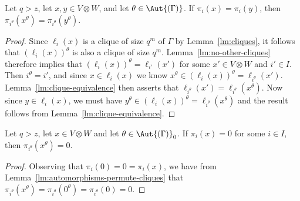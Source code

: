 \begin{lemma} \label{lm:automorphisms-permute-cliques}
Let $q > z$, let $x, y \in V \otimes W$, and let $\theta \in \Aut{\left(\Gamma \right)}$. If $\pi_i{\left(x \right)} = \pi_i{\left(y \right)}$, then $\pi_{i^\theta}{\left(x^\theta \right)} = \pi_{i^\theta}{\left(y^\theta \right)}$.
\end{lemma}
\begin{proof}
Since $\ell_i{\left(x \right)}$ is a clique of size $q^m$ of $\Gamma$ by Lemma~\ref{lm:cliques}, it follows that $\left(\ell_i{\left(x \right)}\right)^\theta$ is also a clique of size $q^m$. Lemma~\ref{lm:no-other-cliques} therefore implies that $\left(\ell_i{\left(x \right)}\right)^\theta = \ell_{i'}{\left(x' \right)}$ for some $x' \in V \otimes W$ and $i' \in I$. Then $i^\theta = i'$, and since $x \in \ell_i{\left(x \right)}$ we know $x^\theta \in \left(\ell_i{\left(x \right)}\right)^\theta = \ell_{i^\theta}{\left(x' \right)}$. Lemma~\ref{lm:clique-equivalence} then asserts that $\ell_{i^\theta}{\left(x' \right)} = \ell_{i^\theta}{\left(x^\theta \right)}$. Now since $y \in \ell_i{\left(x \right)}$, we must have $y^\theta \in \left(\ell_i{\left(x \right)}\right)^\theta = \ell_{i^\theta}{\left(x^\theta \right)}$ and the result follows from Lemma~\ref{lm:clique-equivalence}.
\end{proof}

\begin{lemma} \label{lm:image-of-projection-to-zero}
Let $q > z$, let $x \in V \otimes W$ and let $\theta \in \Aut{\left(\Gamma \right)}_0$. If $\pi_i{\left(x \right)} = 0$ for some $i \in I$, then $\pi_{i^\theta}{\left(x^\theta \right)} = 0$.
\end{lemma}
\begin{proof}
Observing that $\pi_i{\left(0 \right)} = 0 = \pi_i{\left(x \right)}$, we have from Lemma~\ref{lm:automorphisms-permute-cliques} that $\pi_{i^\theta}{\left(x^\theta \right)} = \pi_{i^\theta}{\left(0^\theta \right)} = \pi_{i^\theta}{\left(0 \right)} = 0$.
\end{proof}


